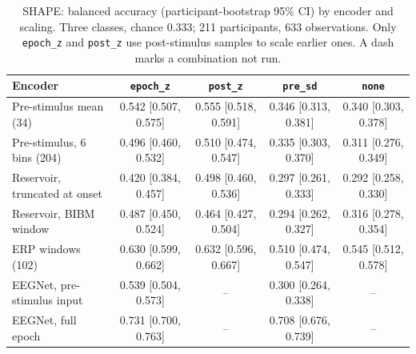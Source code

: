 \begin{table}[t]
\centering
\caption{SHAPE: balanced accuracy (participant-bootstrap 95\% CI) by encoder and scaling. Three classes, chance 0.333; 211 participants, 633 observations. Only \texttt{epoch\_z} and \texttt{post\_z} use post-stimulus samples to scale earlier ones. A dash marks a combination not run.}
\label{tab:shape}
\begin{tabular}{lcccc}
\toprule
Encoder & \texttt{epoch\_z} & \texttt{post\_z} & \texttt{pre\_sd} & \texttt{none} \\
\midrule
Pre-stimulus mean (34) & 0.542 [0.507, 0.575] & 0.555 [0.518, 0.591] & 0.346 [0.313, 0.381] & 0.340 [0.303, 0.378] \\
Pre-stimulus, 6 bins (204) & 0.496 [0.460, 0.532] & 0.510 [0.474, 0.547] & 0.335 [0.303, 0.370] & 0.311 [0.276, 0.349] \\
Reservoir, truncated at onset & 0.420 [0.384, 0.457] & 0.498 [0.460, 0.536] & 0.297 [0.261, 0.333] & 0.292 [0.258, 0.330] \\
Reservoir, BIBM window & 0.487 [0.450, 0.524] & 0.464 [0.427, 0.504] & 0.294 [0.262, 0.327] & 0.316 [0.278, 0.354] \\
ERP windows (102) & 0.630 [0.599, 0.662] & 0.632 [0.596, 0.667] & 0.510 [0.474, 0.547] & 0.545 [0.512, 0.578] \\
EEGNet, pre-stimulus input & 0.539 [0.504, 0.573] & -- & 0.300 [0.264, 0.338] & -- \\
EEGNet, full epoch & 0.731 [0.700, 0.763] & -- & 0.708 [0.676, 0.739] & -- \\
\bottomrule
\end{tabular}
\end{table}
